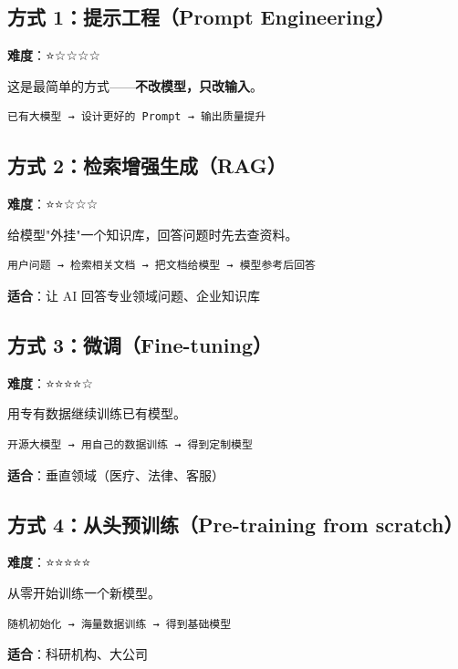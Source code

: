 \documentclass[12pt,UTF8]{ctexbook}
\begin{document}
\subsection{方式 1：提示工程（Prompt Engineering）}

\textbf{难度}：⭐☆☆☆☆

这是最简单的方式——\textbf{不改模型，只改输入}。

\begin{verbatim}
已有大模型 → 设计更好的 Prompt → 输出质量提升
\end{verbatim}

\subsection{方式 2：检索增强生成（RAG）}

\textbf{难度}：⭐⭐☆☆☆

给模型"外挂"一个知识库，回答问题时先去查资料。

\begin{verbatim}
用户问题 → 检索相关文档 → 把文档给模型 → 模型参考后回答
\end{verbatim}

\textbf{适合}：让 AI 回答专业领域问题、企业知识库

\subsection{方式 3：微调（Fine-tuning）}

\textbf{难度}：⭐⭐⭐⭐☆

用专有数据继续训练已有模型。

\begin{verbatim}
开源大模型 → 用自己的数据训练 → 得到定制模型
\end{verbatim}

\textbf{适合}：垂直领域（医疗、法律、客服）

\subsection{方式 4：从头预训练（Pre-training from scratch）}

\textbf{难度}：⭐⭐⭐⭐⭐

从零开始训练一个新模型。

\begin{verbatim}
随机初始化 → 海量数据训练 → 得到基础模型
\end{verbatim}

\textbf{适合}：科研机构、大公司
\end{document}
